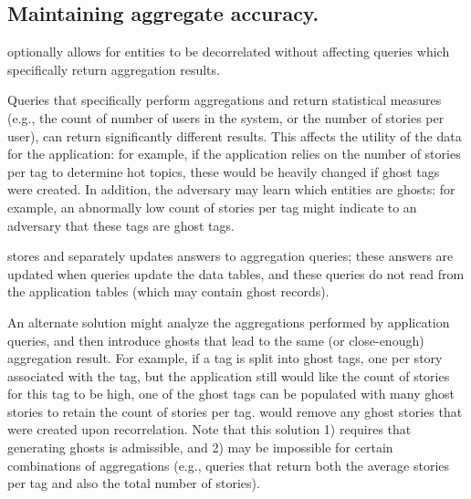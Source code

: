 \subsection{Maintaining aggregate accuracy.}
\sys{} optionally allows for entities to be decorrelated without affecting queries which
specifically return aggregation results.

Queries that specifically perform aggregations and return statistical measures (e.g.,
the count of number of users in the system, or the number of stories per user), can return
significantly different results. This affects the utility of the data for the application: for
example, if the application relies on the number of stories per tag to determine hot topics, these
would be heavily changed if ghost tags were created.  In addition, the adversary may learn which
entities are ghosts: for example, an abnormally low count of stories per tag might indicate to an
adversary that these tags are ghost tags.  

\sys{} stores and separately updates answers to aggregation queries;
these answers are updated when queries update the data tables, and these queries do not read from
the application tables (which may contain ghost records).

An alternate solution might analyze the aggregations performed by application queries, and then
introduce ghosts that lead to the same (or close-enough) aggregation result. For example, if a tag
is split into ghost tags, one per story associated with the tag, but the application still would
like the count of stories for this tag to be high, one of the ghost tags can be populated with many
ghost stories to retain the count of stories per tag.  \sys{} would remove any ghost stories that
were created upon recorrelation. Note that this solution 1) requires that generating ghosts is
admissible, and 2) may be impossible for certain combinations of aggregations (e.g., queries that
return both the average stories per tag and also the total number of stories).



